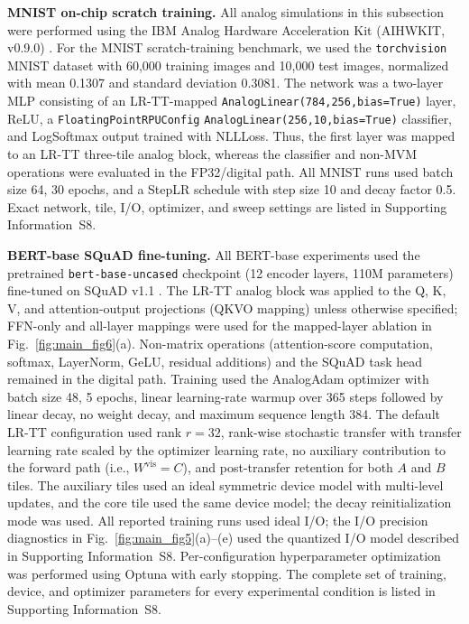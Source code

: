 \documentclass[AMA,LATO2COL]{WileyNJDv5}
\begin{document}
\noindent\textbf{MNIST on-chip scratch training.}
All analog simulations in this subsection were performed using the IBM Analog Hardware Acceleration Kit (AIHWKIT, v0.9.0) \cite{rasch2021aihwkit,legallo2023aihwkit}. For the MNIST scratch-training benchmark, we used the \texttt{torchvision} MNIST dataset with 60,000 training images and 10,000 test images, normalized with mean 0.1307 and standard deviation 0.3081. The network was a two-layer MLP consisting of an LR-TT-mapped \texttt{AnalogLinear(784,256,bias=True)} layer, ReLU, a \texttt{FloatingPointRPUConfig} \texttt{AnalogLinear(256,10,bias=True)} classifier, and LogSoftmax output trained with NLLLoss. Thus, the first layer was mapped to an LR-TT three-tile analog block, whereas the classifier and non-MVM operations were evaluated in the FP32/digital path. All MNIST runs used batch size 64, 30 epochs, and a StepLR schedule with step size 10 and decay factor 0.5. Exact network, tile, I/O, optimizer, and sweep settings are listed in Supporting Information~S8.

\noindent\textbf{BERT-base SQuAD fine-tuning.}
All BERT-base experiments used the pretrained \texttt{bert-base-uncased} checkpoint (12 encoder layers, 110M parameters) fine-tuned on SQuAD v1.1 \cite{devlin2019bert,rajpurkar2016squad}. The LR-TT analog block was applied to the Q, K, V, and attention-output projections (QKVO mapping) unless otherwise specified; FFN-only and all-layer mappings were used for the mapped-layer ablation in Fig.~\ref{fig:main_fig6}(a). Non-matrix operations (attention-score computation, softmax, LayerNorm, GeLU, residual additions) and the SQuAD task head remained in the digital path. Training used the AnalogAdam optimizer with batch size 48, 5 epochs, linear learning-rate warmup over 365 steps followed by linear decay, no weight decay, and maximum sequence length 384. The default LR-TT configuration used rank \(r=32\), rank-wise stochastic transfer with transfer learning rate scaled by the optimizer learning rate, no auxiliary contribution to the forward path (i.e., \(W^{\mathrm{vis}}=C\)), and post-transfer retention for both \(A\) and \(B\) tiles. The auxiliary tiles used an ideal symmetric device model with multi-level updates, and the core tile used the same device model; the decay reinitialization mode was used. All reported training runs used ideal I/O; the I/O precision diagnostics in Fig.~\ref{fig:main_fig5}(a)--(e) used the quantized I/O model described in Supporting Information~S8. Per-configuration hyperparameter optimization was performed using Optuna with early stopping. The complete set of training, device, and optimizer parameters for every experimental condition is listed in Supporting Information~S8.
\end{document}
